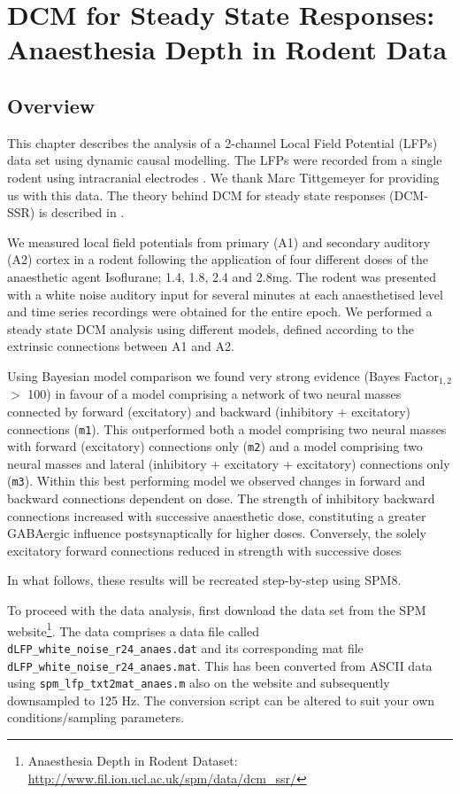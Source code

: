 \chapter{DCM for Steady State Responses: Anaesthesia Depth in Rodent Data\label{Chap:data:dcm_ssr}}

\section{Overview}

This chapter describes the analysis of a 2-channel Local Field Potential (LFPs) data set using dynamic causal modelling. The LFPs were recorded from a single rodent using intracranial electrodes \cite{dcm_ssr_anaesthesia}. We thank Marc Tittgemeyer for providing us with this data. The theory behind DCM for steady state responses (DCM-SSR) is described in \cite{dcm_ssr}.

We measured local field potentials from primary (A1) and secondary auditory (A2) cortex in a rodent following the application of four different doses of the anaesthetic agent Isoflurane; 1.4, 1.8, 2.4 and 2.8mg. The rodent was presented with a white noise auditory input for several minutes at each anaesthetised level and time series recordings were obtained for the entire epoch. We performed a steady state DCM analysis using different models, defined according to the extrinsic connections between A1 and A2.

Using Bayesian model comparison we found very strong evidence (Bayes Factor$_{1,2}$ $>$ 100) in favour of a model comprising a network of two neural masses connected by forward (excitatory) and backward (inhibitory + excitatory) connections (\texttt{m1}). This outperformed both a model comprising two neural masses with forward (excitatory) connections only (\texttt{m2}) and a model comprising two neural masses and lateral (inhibitory + excitatory + excitatory) connections only (\texttt{m3}). Within this best performing model we observed changes in forward and backward connections dependent on dose. The strength of inhibitory backward connections increased with successive anaesthetic dose, constituting a greater GABAergic influence postsynaptically for higher doses. Conversely, the solely excitatory forward connections reduced in strength with successive doses

In what follows, these results will be recreated step-by-step using SPM8.

To proceed with the data analysis, first download the data set from the SPM website\footnote{Anaesthesia Depth in Rodent Dataset: \url{http://www.fil.ion.ucl.ac.uk/spm/data/dcm_ssr/}}. The data comprises a data file called \texttt{dLFP\_white\_noise\_r24\_anaes.dat} and its corresponding mat file \texttt{dLFP\_white\_noise\_r24\_anaes.mat}. This has been converted from ASCII data using \texttt{spm\_lfp\_txt2mat\_anaes.m} also on the website and subsequently downsampled to 125 Hz. The conversion script can be altered to suit your own conditions/sampling parameters.

